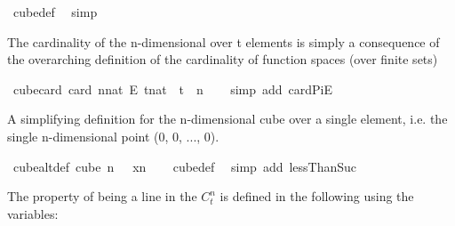 \begin{isabellebody}
\ cube{\isacharunderscore}{\kern0pt}def\ \isamarkupfalse%
\ simp%
\endisatagproof
{\isafoldproof}%
%
\isadelimproof
%
\endisadelimproof
%
\begin{isamarkuptext}%
The cardinality of the n-dimensional over t elements is simply a consequence of the overarching definition of the cardinality of function spaces (over finite sets)%
\end{isamarkuptext}\isamarkuptrue%
\isamarkupfalse%
\ cube{\isacharunderscore}{\kern0pt}card{\isacharcolon}{\kern0pt}\ {\isachardoublequoteopen}card\ {\isacharparenleft}{\kern0pt}{\isacharbraceleft}{\kern0pt}{\isachardot}{\kern0pt}{\isachardot}{\kern0pt}{\isacharless}{\kern0pt}n{\isacharcolon}{\kern0pt}{\isacharcolon}{\kern0pt}nat{\isacharbraceright}{\kern0pt}\ {\isasymrightarrow}\isactrlsub E\ {\isacharbraceleft}{\kern0pt}{\isachardot}{\kern0pt}{\isachardot}{\kern0pt}{\isacharless}{\kern0pt}t{\isacharcolon}{\kern0pt}{\isacharcolon}{\kern0pt}nat{\isacharbraceright}{\kern0pt}{\isacharparenright}{\kern0pt}\ {\isacharequal}{\kern0pt}\ t\ {\isacharcircum}{\kern0pt}\ n{\isachardoublequoteclose}\isanewline
%
\isadelimproof
\ \ %
\endisadelimproof
%
\isatagproof
{}\isamarkupfalse%
\ {\isacharparenleft}{\kern0pt}simp\ add{\isacharcolon}{\kern0pt}\ card{\isacharunderscore}{\kern0pt}PiE{\isacharparenright}{\kern0pt}%
\endisatagproof
{\isafoldproof}%
%
\isadelimproof
%
\endisadelimproof
%
\begin{isamarkuptext}%
A simplifying definition for the n-dimensional cube over a single element, i.e. the single n-dimensional point (0, 0, ..., 0).%
\end{isamarkuptext}\isamarkuptrue%
\isamarkupfalse%
\ cube{}{\isacharunderscore}{\kern0pt}alt{\isacharunderscore}{\kern0pt}def{\isacharcolon}{\kern0pt}\ {\isachardoublequoteopen}cube\ n\ {}\ {\isacharequal}{\kern0pt}\ {\isacharbraceleft}{\kern0pt}{\isasymlambda}x{\isasymin}{\isacharbraceleft}{\kern0pt}{\isachardot}{\kern0pt}{\isachardot}{\kern0pt}{\isacharless}{\kern0pt}n{\isacharbraceright}{\kern0pt}{\isachardot}{\kern0pt}\ {}{\isacharbraceright}{\kern0pt}{\isachardoublequoteclose}%
\isadelimproof
\ %
\endisadelimproof
%
\isatagproof
{}\isamarkupfalse%
\ cube{\isacharunderscore}{\kern0pt}def\ \isamarkupfalse%
\ {\isacharparenleft}{\kern0pt}simp\ add{\isacharcolon}{\kern0pt}\ lessThan{\isacharunderscore}{\kern0pt}Suc{\isacharparenright}{\kern0pt}%
\endisatagproof
{\isafoldproof}%
%
\isadelimproof
%
\endisadelimproof
%
\isadelimdocument
%
\endisadelimdocument
%
\isatagdocument
%
\isamarkuptrue%
%
\endisatagdocument
{\isafolddocument}%
%
\isadelimdocument
%
\endisadelimdocument
%
\begin{isamarkuptext}%
The property of being a line in the $C^n_t$ is defined in the following using the variables:


\end{isamarkuptext}
\end{isabellebody}
